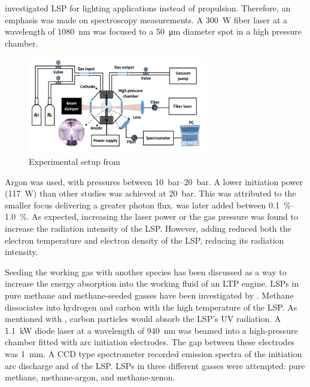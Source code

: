         \textcite{luCharacteristicDiagnosticsLaserStabilized2022a} investigated LSP for lighting applications instead of propulsion. Therefore, an emphasis was made on spectroscopy measurements. A \qty{300}{W} fiber laser at a wavelength of \qty{1080}{nm} was focused to a \qty{50}{μm} diameter spot in a high pressure chamber.
        \begin{figure}[!ht]
            \centering
            \includegraphics[width=0.7\textwidth]{assets/2 background/Lu apparatus.png}
            \caption{Experimental setup from \textcite{luCharacteristicDiagnosticsLaserStabilized2022a}}
            \label{fig:Lu apparatus}
        \end{figure}
        Argon was used, with pressures between \qtyrange{10}{20}{bar}. A lower initiation power (\qty{117}{W}) than other studies was achieved at \qty{20}{bar}. This was attributed to the smaller focus delivering a greater photon flux.  was later added between \qtyrange{0.1}{1.0}{\%}. As expected, increasing the laser power or the gas pressure was found to increase the radiation intensity of the LSP. However, adding  reduced both the electron temperature and electron density of the LSP, reducing its radiation intensity.

        Seeding the working gas with another species has been discussed as a way to increase the energy absorption into the working fluid of an LTP engine. LSPs in pure methane and methane-seeded gasses have been investigated by \textcite{kameiMethaneMethaneXenon2020}. Methane dissociates into hydrogen and carbon with the high temperature of the LSP. As mentioned with \textcite{shojiLaserheatedRocketThruster1977}, carbon particles would absorb the LSP's UV radiation.  A \qty{1.1}{kW} diode laser at a wavelength of \qty{940}{nm} was beamed into a high-pressure chamber fitted with arc initiation electrodes. The gap between these electrodes was \qty{1}{mm}. A CCD type spectrometer recorded emission spectra of the initiation arc discharge and of the LSP. LSPs in three different gasses were attempted: pure methane, methane-argon, and methane-xenon.
        
